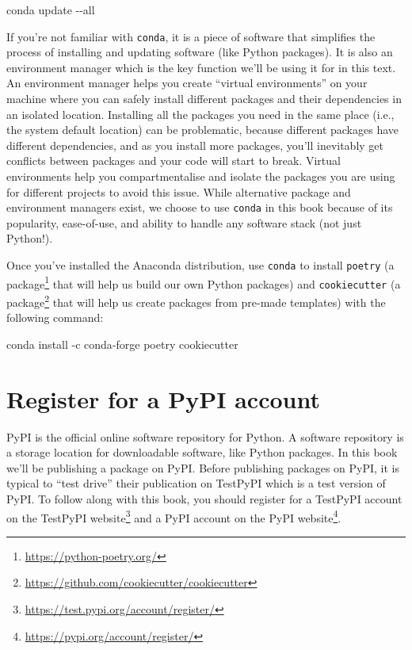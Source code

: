 \documentclass[
]{krantz}
\makeatletter
\newenvironment{Shaded}{\begin{snugshade}}{\end{snugshade}}
\newcommand{\ExtensionTok}[1]{#1}
\newcommand{\NormalTok}[1]{#1}
\renewcommand{\href}[2]{#2\footnote{\url{#1}}}
\newenvironment{kframe}{%
\medskip{}
\setlength{\fboxsep}{.8em}
 \def\at@end@of@kframe{}%
 \ifinner\ifhmode%
  \def\at@end@of@kframe{\end{minipage}}%
  \begin{minipage}{\columnwidth}%
 \fi\fi%
 \def\FrameCommand##1{\hskip\@totalleftmargin \hskip-\fboxsep
 \colorbox{shadecolor}{##1}\hskip-\fboxsep
     \hskip-\linewidth \hskip-\@totalleftmargin \hskip\columnwidth}%
 \MakeFramed {\advance\hsize-\width
   \@totalleftmargin\z@ \linewidth\hsize
   \@setminipage}}%
 {\par\unskip\endMakeFramed%
 \at@end@of@kframe}
\renewenvironment{Shaded}{\begin{kframe}}{\end{kframe}}
\makeatother
\begin{document}
\begin{Shaded}
\begin{Highlighting}[]
\ExtensionTok{conda}\NormalTok{ update {-}{-}all}
\end{Highlighting}
\end{Shaded}

If you're not familiar with \texttt{conda}, it is a piece of software that simplifies the process of installing and updating software (like Python packages). It is also an environment manager which is the key function we'll be using it for in this text. An environment manager helps you create ``virtual environments'' on your machine where you can safely install different packages and their dependencies in an isolated location. Installing all the packages you need in the same place (i.e., the system default location) can be problematic, because different packages have different dependencies, and as you install more packages, you'll inevitably get conflicts between packages and your code will start to break. Virtual environments help you compartmentalise and isolate the packages you are using for different projects to avoid this issue. While alternative package and environment managers exist, we choose to use \texttt{conda} in this book because of its popularity, ease-of-use, and ability to handle any software stack (not just Python!).

Once you've installed the Anaconda distribution, use \texttt{conda} to install \texttt{poetry} (\href{https://python-poetry.org/}{a package} that will help us build our own Python packages) and \texttt{cookiecutter} (\href{https://github.com/cookiecutter/cookiecutter}{a package} that will help us create packages from pre-made templates) with the following command:

\begin{Shaded}
\begin{Highlighting}[]
\ExtensionTok{conda}\NormalTok{ install {-}c conda{-}forge poetry cookiecutter}
\end{Highlighting}
\end{Shaded}

\hypertarget{register-for-a-pypi-account}{%
\section{Register for a PyPI account}\label{register-for-a-pypi-account}}

PyPI is the official online software repository for Python. A software repository is a storage location for downloadable software, like Python packages. In this book we'll be publishing a package on PyPI. Before publishing packages on PyPI, it is typical to ``test drive'' their publication on TestPyPI which is a test version of PyPI. To follow along with this book, you should register for a TestPyPI account on the \href{https://test.pypi.org/account/register/}{TestPyPI website} and a PyPI account on the \href{https://pypi.org/account/register/}{PyPI website}.
\end{document}
